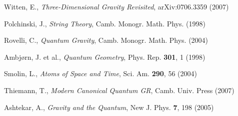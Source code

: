 \documentclass[a4paper, 12pt]{article}
\begin{document}
\begin{thebibliography}{30}
Witten, E., \textit{Three-Dimensional Gravity Revisited}, arXiv:0706.3359 (2007)

Polchinski, J., \textit{String Theory}, Camb. Monogr. Math. Phys. (1998)

Rovelli, C., \textit{Quantum Gravity}, Camb. Monogr. Math. Phys. (2004)

Ambjørn, J. et al., \textit{Quantum Geometry}, Phys. Rep. \textbf{301}, 1 (1998)

Smolin, L., \textit{Atoms of Space and Time}, Sci. Am. \textbf{290}, 56 (2004)

Thiemann, T., \textit{Modern Canonical Quantum GR}, Camb. Univ. Press (2007)

Ashtekar, A., \textit{Gravity and the Quantum}, New J. Phys. \textbf{7}, 198 (2005)

\end{thebibliography}
\end{document}
